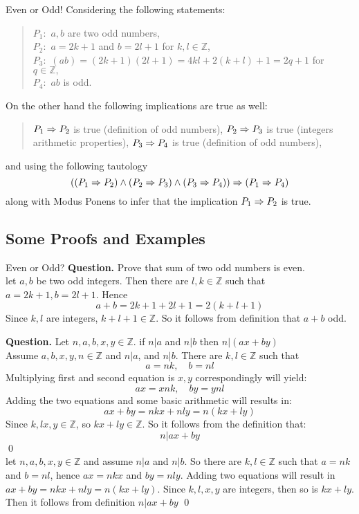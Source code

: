 \begin{example}{Even or Odd!}
	 Considering the following statements:
	\begin{quote}
		$ P_1:$ $ a,b $ are two odd numbers, \\
		$ P_2:$ $ a = 2k+1 $ and $ b=2l+1 $ for $ k,l \in \mathbb{Z} $, \\
		$ P_3:$ $ (ab) = (2k+1)(2l+1) = 4kl+2(k+l)+1 = 2q+1 $ for $ q \in \mathbb{Z}, $ \\
		$ P_4:$ $ ab $ is odd.
	\end{quote}
	On the other hand the following implications are true as well:
	\begin{quote}
		$ P_1 \Rightarrow P_2 $ is true (definition of odd numbers),
		$ P_2 \Rightarrow P_3 $ is true (integers arithmetic properties),
		$ P_3 \Rightarrow P_4 $ is true (definition of odd numbers),
	\end{quote}
	and using the following tautology
	\[  ((P_1 \Rightarrow P_2) \wedge (P_2 \Rightarrow P_3) \wedge (P_3 \Rightarrow P_4)) \Rightarrow (P_1 \Rightarrow P_4)  \]
	along with Modus Ponens to infer that the implication $ P_1 \Rightarrow P_2 $ is true.
\end{example}

\subsection{Some Proofs and Examples}


\begin{example}{Even or Odd?}
	\textbf{Question.} Prove that sum of two odd numbers is even. \\
	
	 let $ a,b $ be two odd integers. Then there are $ l,k \in \mathbb{Z} $ such that $ a = 2k+1, b = 2l+1 $. Hence \[ a+b = 2k+1+2l+1 = 2(k+l+1) \]
	Since $ k,l $ are integers, $ k+l+1 \in \mathbb{Z} $. So it follows from definition that $ a+b $ odd.
\end{example}

\begin{example}{}
	\textbf{Question.} Let $ n,a,b,x,y \in \mathbb{Z} $. if $ n|a $ and $ n|b $ then $ n|(ax+by) $ \\
	
	Assume $ a,b,x,y,n \in \mathbb{Z} $ and $ n|a $, and $ n|b $. There are $ k,l \in \mathbb{Z} $ such that 
	\[ a = nk, \quad b = nl \]
	Multiplying first and second equation is $ x,y $ correspondingly will yield:
	\[ ax = xnk, \quad by = ynl \]
	Adding the two equations and some basic arithmetic will results in: 
	\[ax + by = nkx + nly = n(kx+ly)\]
	Since $ k,lx,y \in \mathbb{Z} $, so $ kx+ly \in \mathbb{Z} $. So it follows from the definition that:
	\[ n|ax + by \] 	\qed \\
	
	 let $ n,a,b,x,y \in \mathbb{Z}$ and assume $ n|a $ and $ n|b $. So there are $ k,l \in \mathbb{Z} $ such that $ a = nk $ and $ b = nl $, hence $ ax = nkx $ and $ by = nly $. Adding two equations will result in $ ax+by = nkx + nly = n (kx+ly) $. Since $ k,l,x,y $ are integers, then so is $ kx+ly $. Then it follows from definition $ n|ax+by $ \qed
\end{example}

